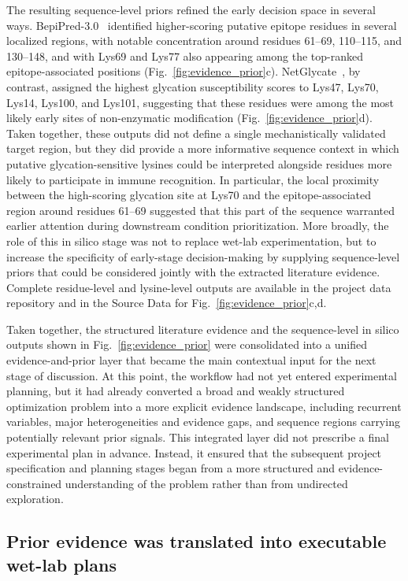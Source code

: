 The resulting sequence-level priors refined the early decision space in several ways. BepiPred-3.0~\cite{CHD+2022} identified higher-scoring putative epitope residues in several localized regions, with notable concentration around residues 61--69, 110--115, and 130--148, and with Lys69 and Lys77 also appearing among the top-ranked epitope-associated positions (Fig.~\ref{fig:evidence_prior}c). NetGlycate~\cite{JKB2006}, by contrast, assigned the highest glycation susceptibility scores to Lys47, Lys70, Lys14, Lys100, and Lys101, suggesting that these residues were among the most likely early sites of non-enzymatic modification (Fig.~\ref{fig:evidence_prior}d). Taken together, these outputs did not define a single mechanistically validated target region, but they did provide a more informative sequence context in which putative glycation-sensitive lysines could be interpreted alongside residues more likely to participate in immune recognition. In particular, the local proximity between the high-scoring glycation site at Lys70 and the epitope-associated region around residues 61--69 suggested that this part of the sequence warranted earlier attention during downstream condition prioritization. More broadly, the role of this in silico stage was not to replace wet-lab experimentation, but to increase the specificity of early-stage decision-making by supplying sequence-level priors that could be considered jointly with the extracted literature evidence.
Complete residue-level and lysine-level outputs are available in the project data repository and in the Source Data for Fig.~\ref{fig:evidence_prior}c,d.

Taken together, the structured literature evidence and the sequence-level in silico outputs shown in Fig.~\ref{fig:evidence_prior} were consolidated into a unified evidence-and-prior layer that became the main contextual input for the next stage of discussion. At this point, the workflow had not yet entered experimental planning, but it had already converted a broad and weakly structured optimization problem into a more explicit evidence landscape, including recurrent variables, major heterogeneities and evidence gaps, and sequence regions carrying potentially relevant prior signals. This integrated layer did not prescribe a final experimental plan in advance. Instead, it ensured that the subsequent project specification and planning stages began from a more structured and evidence-constrained understanding of the problem rather than from undirected exploration.

\subsection{Prior evidence was translated into executable wet-lab plans}

